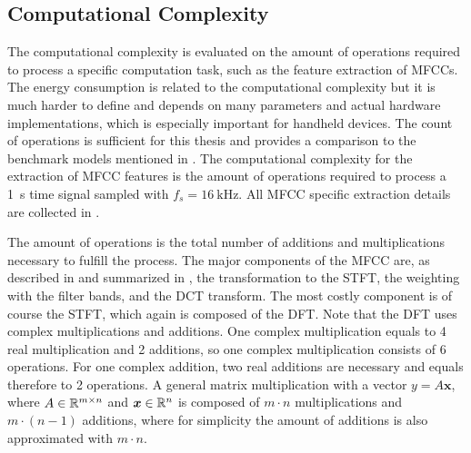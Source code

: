 
\subsection{Computational Complexity}\label{sec:signal_mfcc_complexity}
The computational complexity is evaluated on the amount of operations required to process a specific computation task, such as the feature extraction of MFCCs.
The energy consumption is related to the computational complexity but it is much harder to define and depends on many parameters and actual hardware implementations, which is especially important for handheld devices.
The count of operations is sufficient for this thesis and provides a comparison to the benchmark models mentioned in .
The computational complexity for the extraction of MFCC features is the amount of operations required to process a \SI{1}{\second} time signal sampled with $f_s = \SI{16}{\kilo\hertz}$.
All MFCC specific extraction details are collected in .

The amount of operations is the total number of additions and multiplications necessary to fulfill the process.
The major components of the MFCC are, as described in  and summarized in , the transformation to the STFT, the weighting with the filter bands, and the DCT transform.
The most costly component is of course the STFT, which again is composed of the DFT.
Note that the DFT uses complex multiplications and additions.
One complex multiplication equals to 4 real multiplication and 2 additions, so one complex multiplication consists of 6 operations.
For one complex addition, two real additions are necessary and equals therefore to 2 operations.
A general matrix multiplication with a vector $y = A \bm{x}$, where $A \in \mathbb{R}^{m \times n}$ and $\bm{x} \in \mathbb{R}^n$ is composed of $m \cdot n$ multiplications and $m \cdot (n - 1)$ additions, where for simplicity the amount of additions is also approximated with $m \cdot n$.

